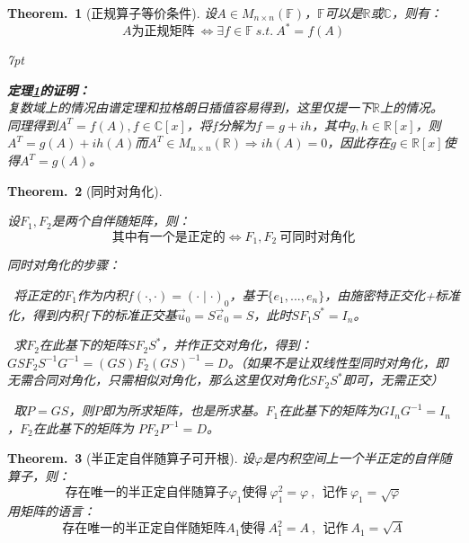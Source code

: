 \documentclass[zihao=5,UTF8]{report}
\def\F{\mathbb{F}}
\def\R{\mathbb{R}}
\def\C{\mathbb{C}}
\theoremstyle{mystyle} %
\newtheorem{theorem}{Theorem.\,}
\newenvironment{graybox}{%
\def\FrameCommand{%
\hspace{1pt}%
{\color{gray}\small \vrule width 2pt}%
{\color{graybox_color}\vrule width 4pt}%
\colorbox{graybox_color}%
}%
\MakeFramed{\advance\hsize-\width\FrameRestore}%
\noindent\hspace{-4.55pt}%
\begin{adjustwidth}{}{7pt}%
\vspace{2pt}\vspace{2pt}%
}
{%
\vspace{2pt}\end{adjustwidth}\endMakeFramed%
}
\begin{document}
\begin{theorem}[正规算子等价条件]\label{正规算子等价条件}
设$A\in M_{n\times n}(\F)$，$\F$可以是$\R$或$\C$，则有：
\begin{equation*}
    \text{$A$为正规矩阵}\ \Longleftrightarrow \exists f \in \F\ s.t.\ A^* = f(A)
\end{equation*}
\begin{graybox}
\textbf{定理\ref{正规算子等价条件}的证明：}\\
复数域上的情况由谱定理和拉格朗日插值容易得到，这里仅提一下$\R$上的情况。\\
同理得到$A^T = f(A), f \in \C[x]$，将$f$分解为$f = g +ih$，其中$g,h \in \R[x]$，则$A^T = g(A) + ih(A) $而$A^T \in M_{n\times n}(\R) \Longrightarrow ih(A) = 0$，因此存在$g \in \R[x]$使得$A^T = g(A)$。
\end{graybox}
\end{theorem}


\begin{theorem}[同时对角化]\label{内积同时对角化}

设$F_1,F_2$是两个自伴随矩阵，则：
\begin{equation*}
    \text{其中有一个是正定的} \Longleftrightarrow F_1,F_2\ \text{可同时对角化} 
\end{equation*}
{\par\color{gray}\small
同时对角化的步骤：
\par{}\ 将正定的$F_1$作为内积$f(\cdot,\cdot) = (\cdot\mid\cdot)_0$，基于$\{e_1,...,e_n\}$，由施密特正交化+标准化，得到内积$f$下的标准正交基$\vec{u}_0 = S\vec{e}_0 = S$，此时$SF_1S^* = I_n$。  \par
{}\  求$F_2$在此基下的矩阵$SF_2S^*$，并作正交对角化，得到：
$GSF_2S^{-1}G^{-1} = (GS)F_2(GS)^{-1} = D$。（如果不是让双线性型同时对角化，即无需合同对角化，只需相似对角化，那么这里仅对角化$SF_2S^*$即可，无需正交）  \par
{}\  取$P = GS$，则$P$即为所求矩阵，也是所求基。$F_1$在此基下的矩阵为$GI_nG^{-1} = I_n$，$F_2$在此基下的矩阵为 $PF_2P^{-1} = D$。  \par
\par}

\end{theorem}

\begin{theorem}[半正定自伴随算子可开根]\label{半正定自伴随算子可开根}
设$\varphi$是内积空间上一个半正定的自伴随算子，则：
\begin{equation*}
    \text{存在唯一的半正定自伴随算子$\varphi_1$使得}\ \varphi_1^2 = \varphi\ ,\ \ \text{记作}\ \varphi_1 = \sqrt{\varphi} 
\end{equation*}
用矩阵的语言：
\begin{equation*}
    \text{存在唯一的半正定自伴随矩阵$A_1$使得}\ A_1^2 = A\ ,\ \ \text{记作}\ A_1 = \sqrt{A} 
\end{equation*}
\end{theorem}
\end{document}
